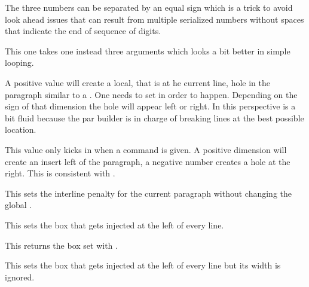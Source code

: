 The three numbers can be separated by an equal sign which is a trick to avoid
look ahead issues that can result from multiple serialized numbers without spaces
that indicate the end of sequence of digits.

\stopnewprimitive

\startnewprimitive[title={\prm {localcontrolledrepeat}}]

This one takes one instead three arguments which looks a bit better
in simple looping.

\stopnewprimitive

\startnewprimitive[title={\prm {localhangafter}}]

A positive value will create a local, that is at he current line, hole in the
paragraph similar to a . One needs to set 
in order to happen. Depending on the sign of that dimension the hole will appear
left or right. In this perspective  is a bit fluid because the
par builder is in charge of breaking lines at the best possible location.

\stopnewprimitive

\startnewprimitive[title={\prm {localhangindent}}]

This value only kicks in when a  command is given. A
positive dimension will create an insert left of the paragraph, a negative
number creates a hole at the right. This is consistent with .

\stopnewprimitive

\startnewprimitive[title={\prm {localinterlinepenalty}}]

This sets the interline penalty for the current paragraph without changing the
global .

\stopnewprimitive

\startnewprimitive[title={\prm {localleftbox}}]

This sets the box that gets injected at the left of every line.

\stopnewprimitive

\startnewprimitive[title={\prm {localleftboxbox}}]

This returns the box set with .

\stopnewprimitive

\startnewprimitive[title={\prm {localmiddlebox}}]

This sets the box that gets injected at the left of every line but its width
is ignored.

